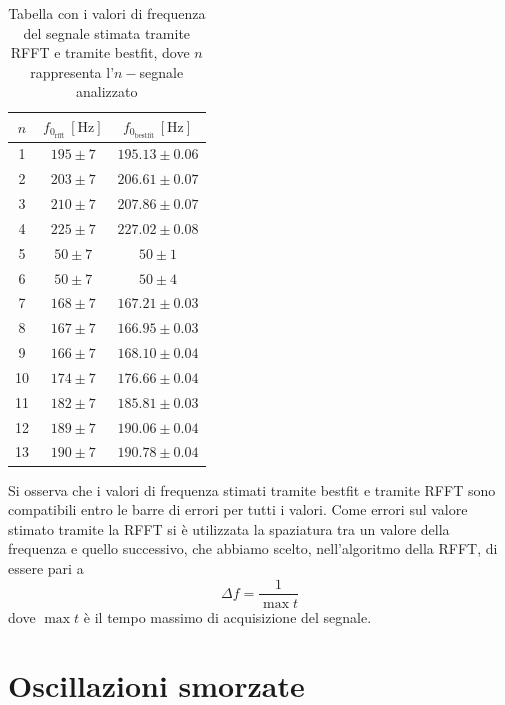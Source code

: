 \documentclass{article}
\begin{document}
        \begin{table}[H]
            \centering
            \begin{tabular}{c c c}
                \toprule
                $n$ & $f_{0_\text{rfft}} \, [\text{Hz}]$ & $f_{0_\text{bestfit}} \, [\text{Hz}]$ \\
                \midrule
                1 & $195 \pm 7$         & $195.13 \pm 0.06$ \\
                2 & $203 \pm 7$       & $206.61 \pm 0.07$ \\
                3 & $210 \pm 7$         & $207.86 \pm 0.07$ \\
                4 & $225 \pm 7$         & $227.02 \pm 0.08$ \\
                5 & $50 \pm 7$          & $50 \pm 1$ \\
                6 & $50 \pm 7$          & $50 \pm 4$ \\
                7 & $168 \pm 7$         & $167.21 \pm 0.03$ \\
                8 & $167 \pm 7$         & $166.95 \pm 0.03$ \\
                9 & $166 \pm 7$         & $168.10 \pm 0.04$ \\
                10 & $174 \pm 7$        & $176.66 \pm 0.04$ \\
                11 & $182 \pm 7$        & $185.81 \pm 0.03$ \\
                12 & $189 \pm 7$        & $190.06 \pm 0.04$ \\
                13 & $190 \pm 7$        & $190.78 \pm 0.04$ \\
                \bottomrule
            \end{tabular}
            \caption{Tabella con i valori di frequenza del segnale stimata tramite RFFT e tramite bestfit, dove $n$ rappresenta l'$n-$segnale analizzato}
            \label{tab:cft_rfft_bestfit}
        \end{table}
    Si osserva che i valori di frequenza stimati tramite bestfit e tramite RFFT sono compatibili entro le barre di errori per tutti i valori. Come errori sul valore stimato tramite la RFFT si è utilizzata la spaziatura tra un valore della frequenza e quello successivo, che abbiamo scelto, nell'algoritmo della RFFT, di essere pari a 
        $$
            \Delta f = \frac{1}{\max{t}}
        $$
    dove $\max{t}$ è il tempo massimo di acquisizione del segnale.
\section{Oscillazioni smorzate}
\end{document}
